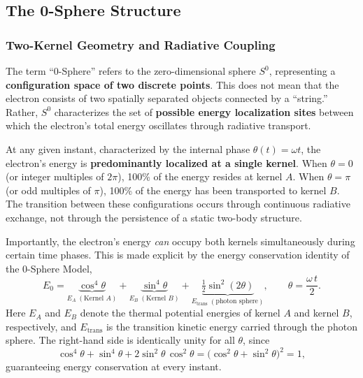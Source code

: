 \documentclass[12pt,letterpaper]{article}
\begin{document}
\subsection{The 0-Sphere Structure}
\label{subsec:0sphere_structure}

\subsubsection{Two-Kernel Geometry and Radiative Coupling}
\label{subsubsec:two_kernel}

The term ``0-Sphere'' refers to the zero-dimensional sphere $S^0$, representing a \textbf{configuration space of two discrete points}. This does not mean that the electron consists of two spatially separated objects connected by a ``string.'' Rather, $S^0$ characterizes the set of \textbf{possible energy localization sites} between which the electron's total energy oscillates through radiative transport.

At any given instant, characterized by the internal phase $\theta(t) = \omega t$, the electron's energy is \textbf{predominantly localized at a single kernel}. When $\theta = 0$ (or integer multiples of $2\pi$), 100\% of the energy resides at kernel $A$. When $\theta = \pi$ (or odd multiples of $\pi$), 100\% of the energy has been transported to kernel $B$. The transition between these configurations occurs through continuous radiative exchange, not through the persistence of a static two-body structure.

Importantly, the electron's energy \textit{can} occupy both kernels simultaneously during certain time phases. This is made explicit by the energy conservation identity of the 0-Sphere Model,
\begin{equation}
  E_0 = \underbrace{\cos^4\!\theta}_{E_A\;(\text{Kernel }A)} + \underbrace{\sin^4\!\theta}_{E_B\;(\text{Kernel }B)} + \underbrace{\tfrac{1}{2}\sin^2\!(2\theta)}_{E_{\mathrm{trans}}\;(\text{photon sphere})}, \qquad \theta = \frac{\omega\, t}{2}.
  \label{eq:energy_conservation}
\end{equation}
Here $E_A$ and $E_B$ denote the thermal potential energies of kernel $A$ and kernel $B$, respectively, and $E_{\mathrm{trans}}$ is the transition kinetic energy carried through the photon sphere. The right-hand side is identically unity for all $\theta$, since
\[
  \cos^4\!\theta + \sin^4\!\theta + 2\sin^2\!\theta\,\cos^2\!\theta = \bigl(\cos^2\!\theta + \sin^2\!\theta\bigr)^2 = 1,
\]
guaranteeing energy conservation at every instant.
\end{document}
